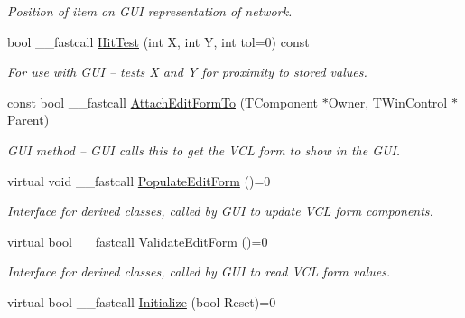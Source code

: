 \begin{DoxyCompactItemize}
\begin{DoxyCompactList}\small\item\em Position of item on G\+U\+I representation of network. \end{DoxyCompactList}\item 
\hypertarget{class_t_r_t_base_a197af02c2de02e8320dd659474a4e74b}{bool \+\_\+\+\_\+fastcall \hyperlink{class_t_r_t_base_a197af02c2de02e8320dd659474a4e74b}{Hit\+Test} (int X, int Y, int tol=0) const }\label{class_t_r_t_base_a197af02c2de02e8320dd659474a4e74b}

\begin{DoxyCompactList}\small\item\em For use with G\+U\+I -- tests X and Y for proximity to stored values. \end{DoxyCompactList}\item 
const bool \+\_\+\+\_\+fastcall \hyperlink{class_t_r_t_base_acd50b266b33d3db3142f4ef0b0e8a7d8}{Attach\+Edit\+Form\+To} (T\+Component $\ast$Owner, T\+Win\+Control $\ast$Parent)
\begin{DoxyCompactList}\small\item\em G\+U\+I method -- G\+U\+I calls this to get the V\+C\+L form to show in the G\+U\+I. \end{DoxyCompactList}\item 
\hypertarget{class_t_r_t_base_a42793e9cca7c36b284457c8483f1718b}{virtual void \+\_\+\+\_\+fastcall \hyperlink{class_t_r_t_base_a42793e9cca7c36b284457c8483f1718b}{Populate\+Edit\+Form} ()=0}\label{class_t_r_t_base_a42793e9cca7c36b284457c8483f1718b}

\begin{DoxyCompactList}\small\item\em Interface for derived classes, called by G\+U\+I to update V\+C\+L form components. \end{DoxyCompactList}\item 
\hypertarget{class_t_r_t_base_aa00f2ee3d1c785f8a46ca16deef674c7}{virtual bool \+\_\+\+\_\+fastcall \hyperlink{class_t_r_t_base_aa00f2ee3d1c785f8a46ca16deef674c7}{Validate\+Edit\+Form} ()=0}\label{class_t_r_t_base_aa00f2ee3d1c785f8a46ca16deef674c7}

\begin{DoxyCompactList}\small\item\em Interface for derived classes, called by G\+U\+I to read V\+C\+L form values. \end{DoxyCompactList}\item 
\hypertarget{class_t_r_t_base_a50d3183e5a738cfbb5bbd8b0cb7c5f89}{virtual bool \+\_\+\+\_\+fastcall \hyperlink{class_t_r_t_base_a50d3183e5a738cfbb5bbd8b0cb7c5f89}{Initialize} (bool Reset)=0}\label{class_t_r_t_base_a50d3183e5a738cfbb5bbd8b0cb7c5f89}


\end{DoxyCompactItemize}
